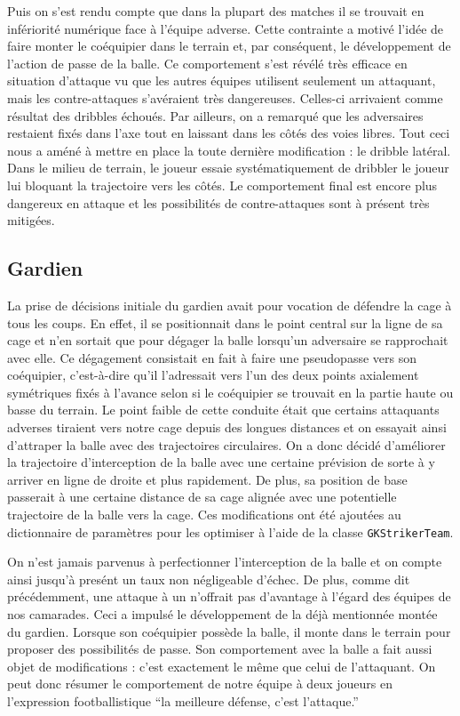 \documentclass[12pt,a4paper]{article}
\begin{document}
Puis on s'est rendu compte que dans la plupart des matches il se trouvait en 
inf\'eriorit\'e num\'erique face \`a l'\'equipe adverse. Cette contrainte a 
motiv\'e l'id\'ee de faire monter le co\'equipier dans le terrain et, par 
cons\'equent, le d\'eveloppement de l'action de passe de la balle.
Ce comportement s'est r\'ev\'el\'e tr\`es efficace en situation d'attaque vu 
que les autres \'equipes utilisent seulement un attaquant, mais les 
contre-attaques s'av\'eraient tr\`es dangereuses. Celles-ci arrivaient comme 
r\'esultat des dribbles \'echou\'es. Par ailleurs, on a remarqu\'e que les 
adversaires restaient fix\'es dans l'axe tout en laissant dans les c\^ot\'es 
des voies libres. Tout ceci nous a am\'en\'e \`a mettre en place la toute 
derni\`ere modification : le dribble lat\'eral. Dans le milieu de terrain, le 
joueur essaie syst\'ematiquement de dribbler le joueur lui bloquant la 
trajectoire vers les c\^ot\'es. Le comportement final est encore plus 
dangereux en attaque et les possibilit\'es de contre-attaques sont \`a 
pr\'esent tr\`es mitig\'ees.

\subsection*{Gardien}
La prise de d\'ecisions initiale du gardien avait pour vocation de d\'efendre 
la cage \`a tous les coups. En effet, il se positionnait dans le point central 
sur la ligne de sa cage et n'en sortait que pour d\'egager la balle lorsqu'un 
adversaire se rapprochait avec elle. 
Ce d\'egagement consistait en fait \`a faire une pseudopasse vers son 
co\'equipier, c'est-\`a-dire qu'il l'adressait vers l'un des deux points 
axialement sym\'etriques fix\'es \`a l'avance selon si le co\'equipier se 
trouvait en la partie haute 
ou basse du terrain. 
Le point faible de cette conduite \'etait que certains attaquants adverses 
tiraient vers notre cage depuis des longues distances et on essayait ainsi 
d'attraper la balle avec des trajectoires circulaires. On a donc d\'ecid\'e 
d'am\'eliorer la trajectoire d'interception de la balle avec une certaine 
pr\'evision de sorte \`a y arriver en ligne de droite et plus rapidement. De 
plus, sa position de base passerait \`a une certaine distance de sa cage 
align\'ee avec une potentielle trajectoire de la balle vers la cage. Ces 
modifications ont \'et\'e ajout\'ees au dictionnaire de param\`etres pour les 
optimiser \`a l'aide de la classe \texttt{GKStrikerTeam}.

On n'est jamais parvenus \`a perfectionner l'interception de la balle et on 
compte ainsi jusqu'\`a pres\'ent un taux non n\'egligeable d'\'echec. De plus, 
comme dit pr\'ec\'edemment, une attaque \`a un n'offrait pas d'avantage \`a 
l'\'egard des \'equipes de nos camarades. Ceci a impuls\'e le 
d\'eveloppement de la d\'ej\`a mentionn\'ee mont\'ee du gardien. Lorsque son 
co\'equipier poss\`ede la balle, il monte dans le terrain pour proposer des 
possibilit\'es de passe. Son comportement avec la balle a fait aussi objet de 
modifications : c'est exactement le m\^eme que celui de l'attaquant.
On peut donc r\'esumer le comportement de notre \'equipe \`a deux joueurs en 
l'expression footballistique \enquote{la meilleure d\'efense, c'est l'attaque.}
\end{document}
